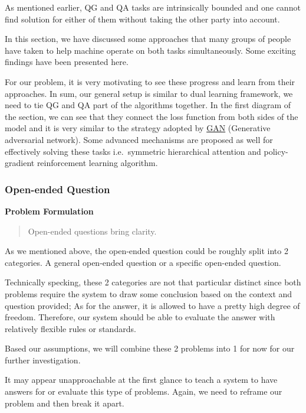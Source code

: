 \documentclass{acm_proc_article-sp}
\renewcommand{\paragraph}[1]{\vskip 6pt\noindent\textbf{#1 }}
\begin{document}
As mentioned earlier, QG and QA tasks are intrinsically bounded and one
cannot find solution for either of them without taking the other party
into account.

In this section, we have discussed some approaches that many groups of
people have taken to help machine operate on both tasks simultaneously.
Some exciting findings have been presented here.

For our problem, it is very motivating to see these progress and learn
from their approaches. In sum, our general setup is similar to dual
learning framework, we need to tie QG and QA part of the algorithms
together. In the first diagram of the section, we can see that they
connect the loss function from both sides of the model and it is very
similar to the strategy adopted by
\href{https://en.wikipedia.org/wiki/Generative_adversarial_network}{GAN}
(Generative adversarial network). Some advanced mechanisms are proposed
as well for effectively solving these tasks i.e.~symmetric hierarchical
attention and policy-gradient reinforcement learning algorithm.

\subsubsection{Open-ended Question}\label{open-ended-question}

\paragraph{Problem Formulation}\label{problem-formulation-1}

\begin{quote}
Open-ended questions bring clarity.
\end{quote}

As we mentioned above, the open-ended question could be roughly split
into 2 categories. A general open-ended question or a specific
open-ended question.

Technically specking, these 2 categories are not that particular
distinct since both problems require the system to draw some conclusion
based on the context and question provided; As for the answer, it is
allowed to have a pretty high degree of freedom. Therefore, our system
should be able to evaluate the answer with relatively flexible rules or
standards.

Based our assumptions, we will combine these 2 problems into 1 for now
for our further investigation.

It may appear unapproachable at the first glance to teach a system to
have answers for or evaluate this type of problems. Again, we need to
reframe our problem and then break it apart.
\end{document}
